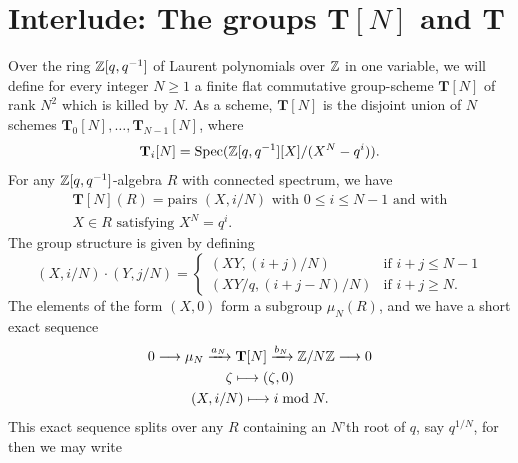 \section{Interlude: The groups $\mathbf{T}[N]$ and $\mathbf{T}$}
\label{sec:8.7}

\kmitem\label{item:8.7.1}
Over the ring $\mathbb{Z}[q,q^{-1}]$ of Laurent polynomials over $\mathbb{Z}$ in one variable, we will define for every integer $N \ge 1$ a finite flat commutative group-scheme $\mathbf{T}[N]$ of rank $N^2$ which is killed by $N$. As a scheme, $\mathbf{T}[N]$ is the disjoint union of $N$ schemes $\mathbf{T}_0[N], \dots, \mathbf{T}_{N-1}[N]$, where
\begin{equation}\label{eq:8.7.1.1}
\mathbf{T}_i[N] = \operatorname{Spec}(\mathbb{Z}[q,q^{-1}][X]/(X^N - q^i)) .
\end{equation}
For any $\mathbb{Z}[q,q^{-1}]$-algebra $R$ with connected spectrum, we have
\begin{equation}\label{eq:8.7.1.2}
\begin{gathered}
\mathbf{T}[N](R) = \text{pairs } (X, i/N) \text{ with } 0 \le i \le N-1 \text{ and with} \\
X \in R \text{ satisfying } X^N = q^i .
\end{gathered}
\end{equation}
The group structure is given by defining
\begin{equation}\label{eq:8.7.1.3}
(X, i/N) \cdot (Y, j/N) = 
\begin{cases}
(XY, (i+j)/N) & \text{if } i+j \le N-1 \\
(XY/q, (i+j-N)/N) & \text{if } i+j \ge N .
\end{cases}
\end{equation}
The elements of the form $(X,0)$ form a subgroup $\mu_N(R)$, and we have a short exact sequence
\begin{equation}\label{eq:8.7.1.4}
\begin{gathered}
0 \longrightarrow \mu_N \xrightarrow{a_N} \mathbf{T}[N] \xrightarrow{b_N} \mathbb{Z}/N\mathbb{Z} \longrightarrow 0 \\
\zeta \longmapsto (\zeta, 0) \\
(X, i/N) \longmapsto i \bmod N .
\end{gathered}
\end{equation}
This exact sequence splits over any $R$ containing an $N$'th root of $q$, say $q^{1/N}$, for then we may write

